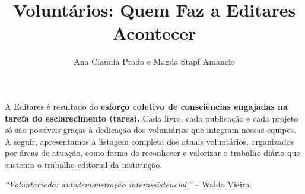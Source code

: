 \documentclass{gescons}
\author{Ana Claudia Prado e Magda Stapf Amancio}
\title{Voluntários: Quem Faz a Editares Acontecer}
\begin{document}
    \makeentrevistatitle


    



A Editares é resultado do \textbf{esforço coletivo de consciências engajadas na tarefa do esclarecimento (tares).} Cada livro, cada publicação e cada projeto só são possíveis graças à dedicação dos voluntários que integram nossas equipes. A seguir, apresentamos a listagem completa dos atuais voluntários, organizados por áreas de atuação, como forma de reconhecer e valorizar o trabalho diário que sustenta o trabalho editorial da instituição.

\emph{``Voluntariado: autodemonstração interassistencial.''} -- Waldo Vieira.
\end{document}
